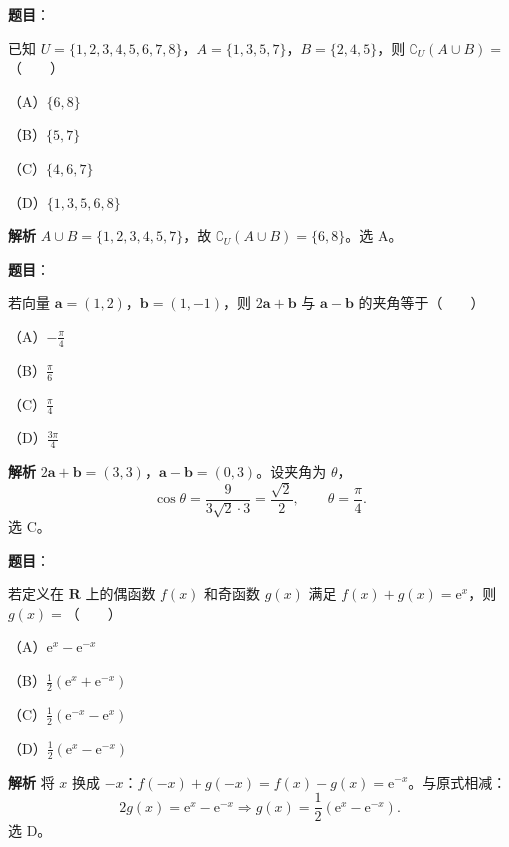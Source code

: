 
\begin{answer}

\textbf{题目}：

已知 $U=\{1,2,3,4,5,6,7,8\}$，$A=\{1,3,5,7\}$，$B=\{2,4,5\}$，则 $\complement_U(A\cup B)=$\mbox{（　　）}

（A）$\{6,8\}$

（B）$\{5,7\}$

（C）$\{4,6,7\}$

（D）$\{1,3,5,6,8\}$

\textbf{解析}
$A\cup B=\{1,2,3,4,5,7\}$，故 $\complement_U(A\cup B)=\{6,8\}$。选 A。


\end{answer}
\begin{answer}

\textbf{题目}：

若向量 $\boldsymbol a=(1,2)$，$\boldsymbol b=(1,-1)$，则 $2\boldsymbol a+\boldsymbol b$ 与 $\boldsymbol a-\boldsymbol b$ 的夹角等于\mbox{（　　）}

（A）$-\frac\pi4$

（B）$\frac\pi6$

（C）$\frac\pi4$

（D）$\frac{3\pi}4$

\textbf{解析}
$2\boldsymbol a+\boldsymbol b=(3,3)$，$\boldsymbol a-\boldsymbol b=(0,3)$。设夹角为 $\theta$，
\nopagebreak[4]
\[\cos\theta=\frac{9}{3\sqrt2\cdot3}=\frac{\sqrt2}2,\qquad\theta=\frac\pi4.\]
选 C。


\end{answer}
\begin{answer}

\textbf{题目}：

若定义在 $\mathbf R$ 上的偶函数 $f(x)$ 和奇函数 $g(x)$ 满足 $f(x)+g(x)=\mathrm e^x$，则 $g(x)=$\mbox{（　　）}

（A）$\mathrm e^x-\mathrm e^{-x}$

（B）$\frac12(\mathrm e^x+\mathrm e^{-x})$

（C）$\frac12(\mathrm e^{-x}-\mathrm e^x)$

（D）$\frac12(\mathrm e^x-\mathrm e^{-x})$

\textbf{解析}
将 $x$ 换成 $-x$：$f(-x)+g(-x)=f(x)-g(x)=\mathrm e^{-x}$。与原式相减：
\nopagebreak[4]
\[2g(x)=\mathrm e^x-\mathrm e^{-x}\Longrightarrow g(x)=\frac12(\mathrm e^x-\mathrm e^{-x}).\]
选 D。


\end{answer}

